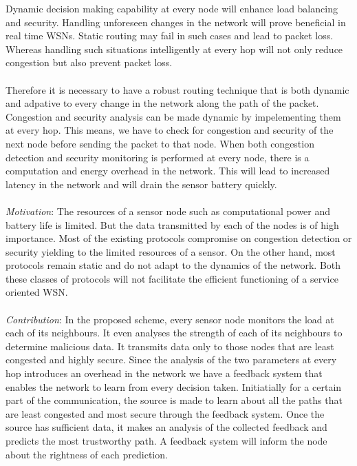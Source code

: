\documentclass[journal]{IEEEtran}
\begin{document}
\indent Dynamic decision making capability at every node will enhance load balancing and security. Handling unforeseen changes in the network will prove beneficial in real time WSNs. Static routing may fail in such cases and lead to packet loss. Whereas handling such situations intelligently at every hop will not only reduce congestion but also prevent packet loss. \\ \\
\indent Therefore it is necessary to have a robust routing technique that is both dynamic and adpative to every change in the network along the path of the packet. Congestion and security analysis can be made dynamic by impelementing them at every hop. This means, we have to check for congestion and security of the next node before sending the packet to that node. When both congestion detection and security monitoring is performed at every node, there is a computation and energy overhead in the network. This will lead to increased latency in the network and will drain the sensor battery quickly. \\ \\
\indent \textit{Motivation}: The resources of a sensor node such as computational power and battery life is limited. But the data transmitted by each of the nodes is of high importance. Most of the existing protocols compromise on congestion detection or security yielding to the limited resources of a sensor. On the other hand, most protocols remain static and do not adapt to the dynamics of the network. Both these classes of protocols will not facilitate the efficient functioning of a service oriented WSN. \\ \\
\indent \textit{Contribution}: In the proposed scheme, every sensor node monitors the load at each of its neighbours. It even analyses the strength of each of its neighbours to determine malicious data. It transmits data only to those nodes that are least congested and highly secure. Since the analysis of the two parameters at every hop introduces an overhead in the network we have a feedback system that enables the network to learn from every decision  taken. Initiatially for a certain part of the communication, the source is made to learn about all the paths that are least congested and most secure through the feedback system. Once the source has sufficient data, it makes an analysis of the collected feedback and predicts the most trustworthy path. A feedback system will inform the node about the rightness of each prediction. \\ \\ 
\end{document}

